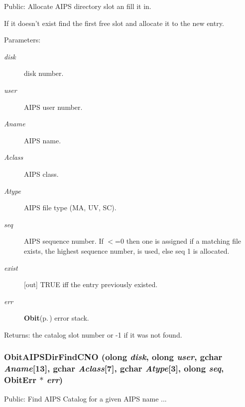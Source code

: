 Public: Allocate AIPS directory slot an fill it in. 

If it doesn't exist find the first free slot and allocate it to the new entry. \begin{Desc}
\item[Parameters:]
\begin{description}
\item[{\em disk}]disk number. \item[{\em user}]AIPS user number. \item[{\em Aname}]AIPS name. \item[{\em Aclass}]AIPS class. \item[{\em Atype}]AIPS file type (MA, UV, SC). \item[{\em seq}]AIPS sequence number. If $<$=0 then one is assigned if a matching file exists, the highest sequence number, is used, else seq 1 is allocated. \item[{\em exist}][out] TRUE iff the entry previously existed. \item[{\em err}]{\bf Obit}{\rm (p.\,\pageref{structObit})} error stack. \end{description}
\end{Desc}
\begin{Desc}
\item[Returns:]the catalog slot number or -1 if it was not found. \end{Desc}
\subsubsection{ Obit\-AIPSDir\-Find\-CNO ({\bf olong} {\em disk}, {\bf olong} {\em user}, gchar {\em Aname}[13], gchar {\em Aclass}[7], gchar {\em Atype}[3], {\bf olong} {\em seq}, {\bf Obit\-Err} $\ast$ {\em err})}\label{ObitAIPSDir_8h_a10}


Public: Find AIPS Catalog for a given AIPS name ... 

